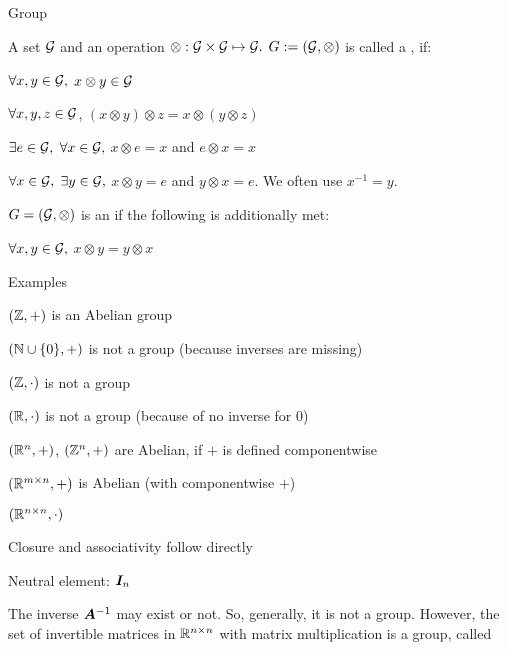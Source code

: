 \documentclass[fleqn,aspectratio=169]{beamer}
\begin{document}
\begin{frame}{Group} 

\plitemsep 0.1in

\bci
\item A set $\mathcal G$ and an operation $\otimes: \mathcal G \times \mathcal G \mapsto \mathcal G.$ $G := (\mathcal G,\otimes)$ is called a , if:

\bce
\item {} $\forall x,y \in \mathcal G,$ $x \otimes y \in \mathcal G$
\item {} $\forall x,y,z \in \mathcal G$, $(x \otimes y) \otimes z = x \otimes (y \otimes z)$
\item {} $\exists e \in \mathcal G,$ $\forall x \in \mathcal G,$ $x \otimes e = x$ and $e \otimes x = x$
\item {} $\forall x \in \mathcal G,$ $\exists y \in \mathcal G,$  $x \otimes y = e$ and $y \otimes x = e.$ We often use $x^{-1} =y.$
\ece

\vspace{1cm}

\item $G = (\mathcal G,\otimes)$ is an  if the following is additionally met:
\bci
\item {} $\forall x,y \in \mathcal G,$ $x \otimes y = y \otimes x$
\eci
\eci
\end{frame}

\begin{frame}{Examples} 

\plitemsep 0.05in

\bci
\item $({\mathbb Z},+)$ is an Abelian group
\item $({\mathbb N} \cup \{ 0\}, +)$ is not a group (because inverses are missing)
\item $({\mathbb Z},\cdot)$ is not a group
\item $({\mathbb R},\cdot)$ is not a group (because of no inverse for 0)
\item $({\mathbb R}^n,+)$, $({\mathbb Z}^n,+)$ are Abelian, if $+$ is defined componentwise

\item $({\mathbb R}^{m \times n},+)$ is Abelian (with componentwise $+$)
\item $({\mathbb R}^{n \times n},\cdot)$
\bci
\item Closure and associativity follow directly 
\item Neutral element: $\bm{I}_n$
\item The inverse ${{\bm{A}}^{-1}}$ may exist or not. So, generally, it is not a group. 
However, the set of invertible matrices in ${\mathbb R}^{n \times n}$ with matrix multiplication  is a group, called 

\eci
\eci
\end{frame}
\end{document}
